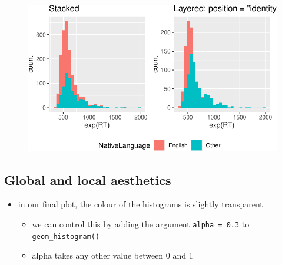 \documentclass[
  letterpaper,
  DIV=11]{scrartcl}
\providecommand{\tightlist}{%
  \setlength{\itemsep}{0pt}\setlength{\parskip}{0pt}}\usepackage{longtable,booktabs,array}
\theoremstyle{definition}
\theoremstyle{remark}
\begin{document}
\begin{figure}[H]

{\centering \includegraphics{_intro_r_slides_files/figure-pdf/unnamed-chunk-21-1.pdf}

}

\end{figure}

\hypertarget{global-and-local-aesthetics}{%
\subsection{Global and local
aesthetics}\label{global-and-local-aesthetics}}

\begin{itemize}
\tightlist
\item
  in our final plot, the colour of the histograms is slightly
  transparent

  \begin{itemize}
  \tightlist
  \item
    we can control this by adding the argument \texttt{alpha\ =\ 0.3} to
    \texttt{geom\_histogram()}
  \item
    alpha takes any other value between 0 and 1
  \end{itemize}
\end{itemize}
\end{document}
